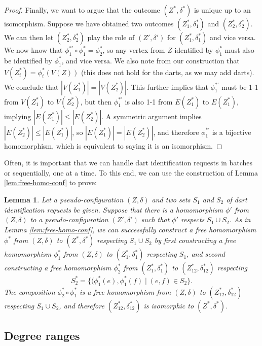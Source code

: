\documentclass[10pt,a4paper]{article}
\newtheorem{lem}[thm]{Lemma}
\begin{document}
\begin{proof}
Finally, we want to argue that the outcome $(Z^*,\delta^*)$ is unique up to an isomorphism. 
Suppose we have obtained two outcomes $(Z^*_1,\delta^*_1)$ and
$(Z^*_2,\delta^*_2)$. We can then let $(Z^*_2,\delta^*_2)$ play the role of $(Z',\delta')$ for $(Z^*_1,\delta^*_1)$ and vice versa. We now know that $\phi^{*\prime}_1\circ \phi^*_1=\phi^*_2$, so any vertex from $Z$ identified by $\phi^*_1$ must also be identified by $\phi^*_1$, and vice versa. We also note from
our construction that $V(Z^*_i)=\phi_i^*(V(Z))$ (this does not hold for the darts, as we may add darts). We conclude that $|V(Z^*_1)|=|V(Z^*_2)|$. This further implies that $\phi^{*\prime}_1$ must be 1-1 from $V(Z^*_1)$ to $V(Z^*_2)$, but then 
$\phi^{*\prime}_1$ is also
1-1 from $E(Z^*_1)$
to $E(Z^*_1)$, implying $|E(Z^*_1)|\leq |E(Z^*_2)|$. A symmetric argument implies
$|E(Z^*_2)|\leq |E(Z^*_1)|$, so
$|E(Z^*_1)|=|E(Z^*_2)|$, and therefore $\phi^{*\prime}_1$
is a bijective homomorphism, which is equivalent to saying it is an isomorphism.
\end{proof}

Often, it is important that we can handle dart identification requests
in batches or sequentially, one at a time. To this end, we can use the construction of Lemma \ref{lem:free-homo-conf} to prove:

\begin{lem}\label{lem:free-homo-conf-trans}
Let a pseudo-configuration $(Z,\delta)$ and two sets $S_1$ and $S_2$ of dart identification requests be given. Suppose that there is a homomorphism $\phi'$ from $(Z,\delta)$ to a 
pseudo-configuration $(Z',\delta')$ such that $\phi'$ respects $S_1\cup S_2$.
As in 
Lemma \ref{lem:free-homo-conf}, we can successfully construct a free homomorphism $\phi^*$ from $(Z,\delta)$ to $(Z^*,\delta^*)$ respecting $S_1\cup S_2$
by first constructing a free homomorphism $\phi_1^*$ from $(Z,\delta)$ to $(Z^*_1,\delta^*_1)$ respecting $S_1$, and second
constructing a free homomorphism $\phi_2^*$ from $(Z^*_1,\delta^*_1)$ to $(Z^*_{12},\delta^*_{12})$
respecting 
\[S^*_2=\{(\phi_1^*(e),\phi_1^*(f)\mid (e,f)\in S_2\}.\]
The composition $\phi^*_2\circ \phi^*_1$ is
a free homomorphism from $(Z,\delta)$ to $(Z^*_{12},\delta^*_{12})$
respecting $S_1\cup S_2$, and
therefore $(Z^*_{12},\delta^*_{12})$ is isomorphic to $(Z^*,\delta^*)$.
\end{lem}

\subsection{Degree ranges}\label{sect:ranges}
\end{document}
